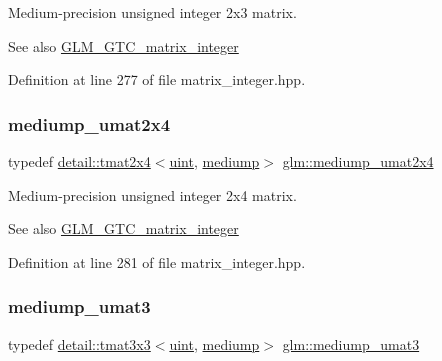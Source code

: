 Medium-\/precision unsigned integer 2x3 matrix. \begin{DoxySeeAlso}{See also}
\hyperlink{group__gtc__matrix__integer}{G\+L\+M\+\_\+\+G\+T\+C\+\_\+matrix\+\_\+integer} 
\end{DoxySeeAlso}


Definition at line 277 of file matrix\+\_\+integer.\+hpp.

\mbox{\label{group__gtc__matrix__integer_gaf79e9c80f024d31f3d66ddae75e90b6c}} 
\subsubsection{\texorpdfstring{mediump\+\_\+umat2x4}{mediump\_umat2x4}}
{\footnotesize\ttfamily typedef \hyperlink{structglm_1_1detail_1_1tmat2x4}{detail\+::tmat2x4}$<$\hyperlink{group__core__precision_ga4fd29415871152bfb5abd588334147c8}{uint}, \hyperlink{namespaceglm_a0f04f086094c747d227af4425893f545a6416f3ea0c9025fb21ed50c4d6620482}{mediump}$>$ \hyperlink{group__gtc__matrix__integer_gaf79e9c80f024d31f3d66ddae75e90b6c}{glm\+::mediump\+\_\+umat2x4}}

Medium-\/precision unsigned integer 2x4 matrix. \begin{DoxySeeAlso}{See also}
\hyperlink{group__gtc__matrix__integer}{G\+L\+M\+\_\+\+G\+T\+C\+\_\+matrix\+\_\+integer} 
\end{DoxySeeAlso}


Definition at line 281 of file matrix\+\_\+integer.\+hpp.

\mbox{\label{group__gtc__matrix__integer_ga123f7d8bac8849e3a150bdf8a21e44a2}} 
\subsubsection{\texorpdfstring{mediump\+\_\+umat3}{mediump\_umat3}}
{\footnotesize\ttfamily typedef \hyperlink{structglm_1_1detail_1_1tmat3x3}{detail\+::tmat3x3}$<$\hyperlink{group__core__precision_ga4fd29415871152bfb5abd588334147c8}{uint}, \hyperlink{namespaceglm_a0f04f086094c747d227af4425893f545a6416f3ea0c9025fb21ed50c4d6620482}{mediump}$>$ \hyperlink{group__gtc__matrix__integer_ga123f7d8bac8849e3a150bdf8a21e44a2}{glm\+::mediump\+\_\+umat3}}

